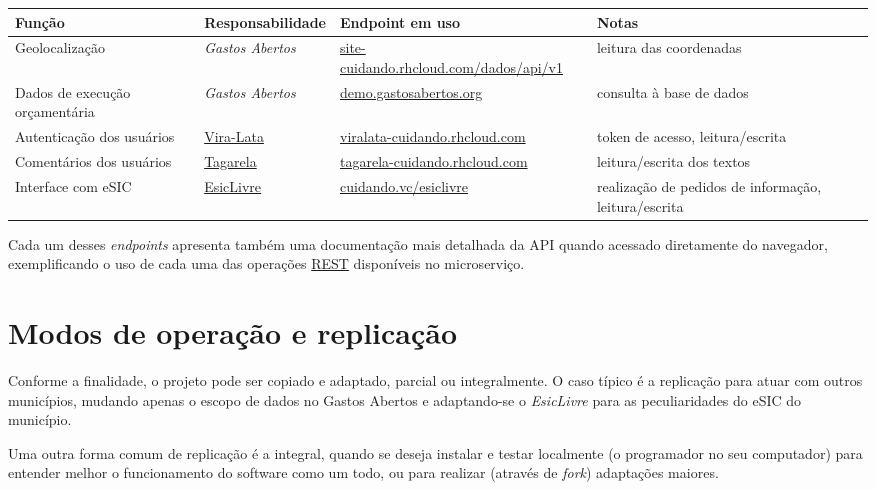\documentclass[letterpaper,10pt,brazil]{sphinxmanual}
\begin{document}
\begin{tabulary}{\linewidth}{|L|L|L|L|}
\hline
\textsf{\relax 
Função
} & \textsf{\relax 
Responsabilidade
} & \textsf{\relax 
\textbf{Endpoint} em uso
} & \textsf{\relax 
Notas
}\\
\hline
Geolocalização
 & 
\emph{Gastos Abertos}
 & 
\href{https://site-cuidando.rhcloud.com/dados/api/v1}{site-cuidando.rhcloud.com/dados/api/v1}
 & 
leitura das coordenadas
\\
\hline
Dados de execução orçamentária
 & 
\emph{Gastos Abertos}
 & 
\href{http://demo.gastosabertos.org}{demo.gastosabertos.org}
 & 
consulta à base de dados
\\
\hline
Autenticação dos usuários
 & 
\href{https://github.com/okfn-brasil/viralata}{Vira-Lata}
 & 
\href{https://viralata-cuidando.rhcloud.com}{viralata-cuidando.rhcloud.com}
 & 
token de acesso, leitura/escrita
\\
\hline
Comentários dos usuários
 & 
\href{https://github.com/okfn-brasil/tagarela}{Tagarela}
 & 
\href{https://tagarela-cuidando.rhcloud.com}{tagarela-cuidando.rhcloud.com}
 & 
leitura/escrita dos textos
\\
\hline
Interface com eSIC
 & 
\href{https://github.com/okfn-brasil/esiclivre}{EsicLivre}
 & 
\href{https://cuidando.vc/esiclivre}{cuidando.vc/esiclivre}
 & 
realização de pedidos de informação, leitura/escrita
\\
\hline\end{tabulary}


Cada um desses \emph{endpoints} apresenta também uma documentação mais
detalhada da API quando acessado diretamente do navegador,
exemplificando o uso de cada uma das operações
\href{https://en.wikipedia.org/wiki/Representational\_state\_transfer}{REST}
disponíveis no microserviço.


\chapter{Modos de operação e replicação}
\label{index:modos-de-operacao-e-replicacao}
Conforme a finalidade, o projeto pode ser copiado e adaptado, parcial ou
integralmente. O caso típico é a replicação para atuar com outros
municípios, mudando apenas o escopo de dados no Gastos Abertos e
adaptando-se o \emph{EsicLivre} para as peculiaridades do eSIC do município.

Uma outra forma comum de replicação é a integral, quando se deseja
instalar e testar localmente (o programador no seu computador) para
entender melhor o funcionamento do software como um todo, ou para
realizar (através de \emph{fork}) adaptações maiores.
\end{document}
